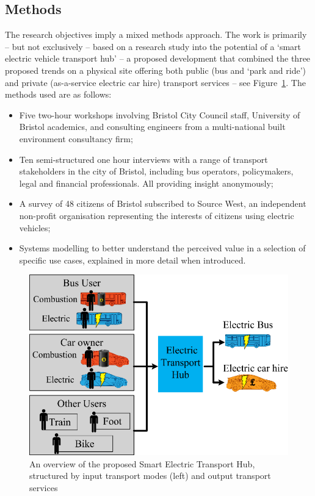 \documentclass[b5paper,10pt]{article}
\begin{document}
\subsection{Methods}

The research objectives imply a mixed methods approach. The work is
primarily -- but not exclusively -- based on a research study into the
potential of a `smart electric vehicle transport hub' -- a proposed
development that combined the three proposed trends on a physical site
offering both public (bus and `park and ride') and private
(as-a-service electric car hire) transport services -- see
Figure~\ref{fig:bristolhub}. The methods used are as follows:

\begin{itemize}
\item Five two-hour workshops involving Bristol City Council staff,
University of Bristol academics, and consulting engineers from a
multi-national built environment consultancy firm;
\item Ten semi-structured one hour interviews with a range of
transport stakeholders in the city of Bristol, including bus
operators, policymakers, legal and financial professionals. All
providing insight anonymously;
\item A survey of 48 citizens of Bristol subscribed to Source West, an
independent non-profit organisation representing the interests of
citizens using electric vehicles;
\item Systems modelling to better understand the perceived value in a
selection of specific use cases, explained in more detail when
introduced.
\end{itemize}

\begin{figure}[!hb]
\centering
\includegraphics[width=0.75\columnwidth]{images/bristolhub.png}
\caption{An overview of the proposed Smart Electric
  Transport Hub, structured by input transport modes (left) and output
  transport services}
\label{fig:bristolhub}
\end{figure}
\end{document}
